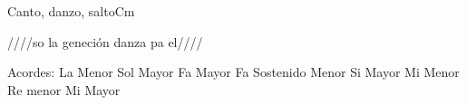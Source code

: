 \documentclass[12pt, spanish]{book}
\begin{document}
\begin{song}{Canto, danzo, salto}{Cm}
\begin{SBExtraKeys}
{            

            \begin{SBOpGroup}
                ////so  la geneción    danza pa  el////~~~~
            \end{SBOpGroup}

            \ifChordBk
            \begin{SBOpGroup}
                Acordes:\break
                \upchord{\Am}\qquad La Menor \hfill
                \upchord{\G}\qquad Sol Mayor \hfill\null\break
                \upchord{\F}\qquad Fa Mayor \hfill
                \upchord{\Fsm}\qquad Fa Sostenido Menor \hfill\null\break
                \upchord{\B}\qquad\qquad\qquad Si Mayor \hfill
                \upchord{\Em}Mi Menor \hfill\null\break
                \upchord{\Dm}\qquad Re menor  \hfill
                \upchord{\E}\qquad Mi Mayor \hfill\null\break
            \end{SBOpGroup}
            \fi
        }\end{SBExtraKeys}
    \end{song}
\end{document}
